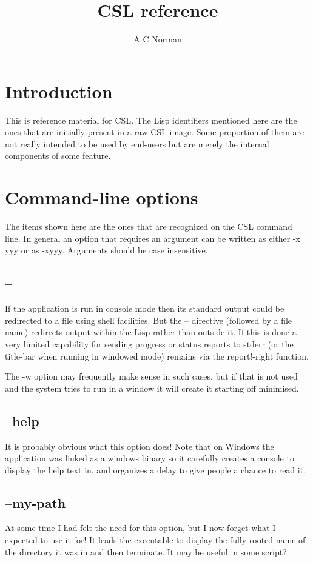 \documentclass[a4paper,11pt]{article}
\title{CSL reference}
\author{A C Norman}
\begin{document}
\maketitle
\section{Introduction}
This is reference material for CSL. The Lisp identifiers mentioned here
are the ones that are initially present in a raw CSL image. Some
proportion of them are not really intended to be used by end-users but
are merely the internal components of some feature.

\section{Command-line options}
The items shown here are the ones that are recognized on the CSL command
line. In general an option that requires an argument can be written as either
{\ttfamily -x yyy} or as {\ttfamily -xyyy}. Arguments should be case
insensitive. 

\subsection{\ttfamily --}
If the application is run in console mode then its standard output could
be redirected to a file using shell facilities. But the {\ttfamily --}
directive (followed by a file name) redirects output within the Lisp rather
than outside it. If this is done a very limited capability for sending
progress or status reports to stderr (or the title-bar when running in windowed
mode) remains via the {\ttfamily report!-right} function.
  
The {\ttfamily -w} option may frequently make sense in such cases, but if that
is not used and the system tries to run in a window it will create it
starting off minimised.

\subsection{\ttfamily --help}
It is probably obvious what this option does! Note that on Windows the
application was linked as a windows binary so it carefully creates a
console to display the help text in, and organizes a delay to give
people a chance to read it.

\subsection{\ttfamily --my-path}
At some time I had felt the need for this option, but I now forget what I
expected to use it for! It leads the executable to display the fully
rooted name of the directory it was in and then terminate. It may be useful
in some script?
\end{document}
